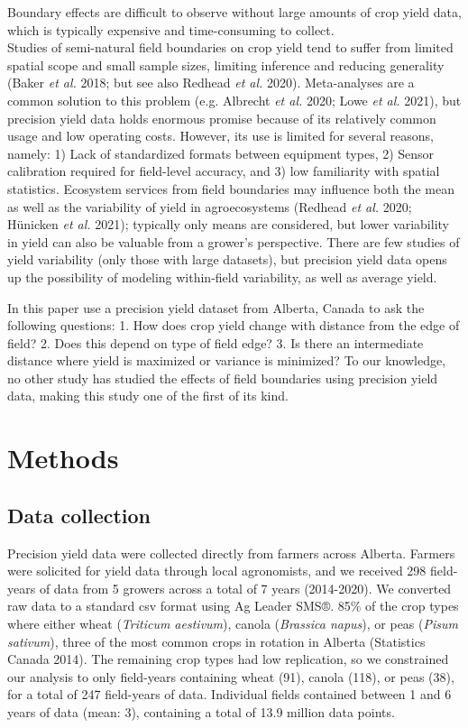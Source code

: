 \documentclass[]{elsarticle} %
\begin{document}
Boundary effects are difficult to observe without large amounts of crop yield data, which is typically expensive and time-consuming to collect.\\
Studies of semi-natural field boundaries on crop yield tend to suffer from limited spatial scope and small sample sizes, limiting inference and reducing generality (Baker \emph{et al.} 2018; but see also Redhead \emph{et al.} 2020).
Meta-analyses are a common solution to this problem (e.g. Albrecht \emph{et al.} 2020; Lowe \emph{et al.} 2021), but precision yield data holds enormous promise because of its relatively common usage and low operating costs.
However, its use is limited for several reasons, namely: 1) Lack of standardized formats between equipment types, 2) Sensor calibration required for field-level accuracy, and 3) low familiarity with spatial statistics.
Ecosystem services from field boundaries may influence both the mean as well as the variability of yield in agroecosystems (Redhead \emph{et al.} 2020; Hünicken \emph{et al.} 2021); typically only means are considered, but lower variability in yield can also be valuable from a grower's perspective.
There are few studies of yield variability (only those with large datasets), but precision yield data opens up the possibility of modeling within-field variability, as well as average yield.

In this paper use a precision yield dataset from Alberta, Canada to ask the following questions:
1. How does crop yield change with distance from the edge of field?
2. Does this depend on type of field edge?
3. Is there an intermediate distance where yield is maximized or variance is minimized?
To our knowledge, no other study has studied the effects of field boundaries using precision yield data, making this study one of the first of its kind.

\hypertarget{methods}{%
\section{Methods}\label{methods}}

\hypertarget{data-collection}{%
\subsection{Data collection}\label{data-collection}}

Precision yield data were collected directly from farmers across Alberta.
Farmers were solicited for yield data through local agronomists, and we received 298 field-years of data from 5 growers across a total of 7 years (2014-2020).
We converted raw data to a standard csv format using Ag Leader SMS®.
85\% of the crop types where either wheat (\emph{Triticum aestivum}), canola (\emph{Brassica napus}), or peas (\emph{Pisum sativum}), three of the most common crops in rotation in Alberta (Statistics Canada 2014).
The remaining crop types had low replication, so we constrained our analysis to only field-years containing wheat (91), canola (118), or peas (38), for a total of 247 field-years of data.
Individual fields contained between 1 and 6 years of data (mean: 3), containing a total of 13.9 million data points.
\end{document}
